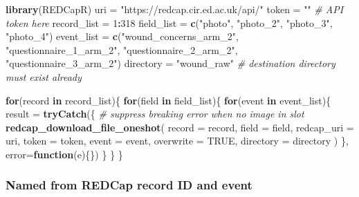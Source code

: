 \documentclass[
]{book}
\newenvironment{Shaded}{\begin{snugshade}}{\end{snugshade}}
\newcommand{\CommentTok}[1]{\textcolor[rgb]{0.56,0.35,0.01}{\textit{#1}}}
\newcommand{\ControlFlowTok}[1]{\textcolor[rgb]{0.13,0.29,0.53}{\textbf{#1}}}
\newcommand{\DataTypeTok}[1]{\textcolor[rgb]{0.13,0.29,0.53}{#1}}
\newcommand{\DecValTok}[1]{\textcolor[rgb]{0.00,0.00,0.81}{#1}}
\newcommand{\KeywordTok}[1]{\textcolor[rgb]{0.13,0.29,0.53}{\textbf{#1}}}
\newcommand{\NormalTok}[1]{#1}
\newcommand{\OperatorTok}[1]{\textcolor[rgb]{0.81,0.36,0.00}{\textbf{#1}}}
\newcommand{\OtherTok}[1]{\textcolor[rgb]{0.56,0.35,0.01}{#1}}
\newcommand{\StringTok}[1]{\textcolor[rgb]{0.31,0.60,0.02}{#1}}
\begin{document}
\begin{Shaded}
\begin{Highlighting}[]
\KeywordTok{library}\NormalTok{(REDCapR)}
\NormalTok{uri =}\StringTok{ "https://redcap.cir.ed.ac.uk/api/"}
\NormalTok{token =}\StringTok{ ""} \CommentTok{# API token here}
\NormalTok{record_list =}\StringTok{ }\DecValTok{1}\OperatorTok{:}\DecValTok{318}
\NormalTok{field_list =}\StringTok{ }\KeywordTok{c}\NormalTok{(}\StringTok{"photo"}\NormalTok{, }\StringTok{"photo_2"}\NormalTok{, }\StringTok{"photo_3"}\NormalTok{, }\StringTok{"photo_4"}\NormalTok{)}
\NormalTok{event_list =}\StringTok{ }\KeywordTok{c}\NormalTok{(}\StringTok{"wound_concerns_arm_2"}\NormalTok{, }\StringTok{"questionnaire_1_arm_2"}\NormalTok{,}
               \StringTok{"questionnaire_2_arm_2"}\NormalTok{, }\StringTok{"questionnaire_3_arm_2"}\NormalTok{)}
\NormalTok{directory =}\StringTok{ "wound_raw"} \CommentTok{# destination directory must exist already}


\ControlFlowTok{for}\NormalTok{(record }\ControlFlowTok{in}\NormalTok{ record_list)\{}
  \ControlFlowTok{for}\NormalTok{(field }\ControlFlowTok{in}\NormalTok{ field_list)\{}
    \ControlFlowTok{for}\NormalTok{(event }\ControlFlowTok{in}\NormalTok{ event_list)\{}
\NormalTok{      result =}\StringTok{ }
\StringTok{        }\KeywordTok{tryCatch}\NormalTok{(\{      }\CommentTok{# suppress breaking error when no image in slot}
          \KeywordTok{redcap_download_file_oneshot}\NormalTok{(}
            \DataTypeTok{record        =}\NormalTok{ record,}
            \DataTypeTok{field         =}\NormalTok{ field,}
            \DataTypeTok{redcap_uri    =}\NormalTok{ uri,}
            \DataTypeTok{token         =}\NormalTok{ token,}
            \DataTypeTok{event         =}\NormalTok{ event,}
            \DataTypeTok{overwrite     =} \OtherTok{TRUE}\NormalTok{,}
            \DataTypeTok{directory     =}\NormalTok{ directory}
\NormalTok{          )}
\NormalTok{        \}, }\DataTypeTok{error=}\ControlFlowTok{function}\NormalTok{(e)\{\})}
\NormalTok{    \}}
\NormalTok{  \}}
\NormalTok{\}}
\end{Highlighting}
\end{Shaded}

\hypertarget{named-from-redcap-record-id-and-event}{%
\subsubsection{Named from REDCap record ID and event}\label{named-from-redcap-record-id-and-event}}
\end{document}
